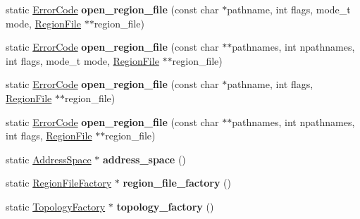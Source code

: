\begin{DoxyCompactItemize}
\item 
static \hyperlink{group__ERRORCODES_ga6263a3c9a0b8d36aea21cdd835ac99fe}{Error\+Code} {\bfseries open\+\_\+region\+\_\+file} (const char $\ast$pathname, int flags, mode\+\_\+t mode, \hyperlink{classalps_1_1RegionFile}{Region\+File} $\ast$$\ast$region\+\_\+file)\hypertarget{classalps_1_1Pegasus_aa7330693d15beebbf829e296a984a5a7}{}\label{classalps_1_1Pegasus_aa7330693d15beebbf829e296a984a5a7}

\item 
static \hyperlink{group__ERRORCODES_ga6263a3c9a0b8d36aea21cdd835ac99fe}{Error\+Code} {\bfseries open\+\_\+region\+\_\+file} (const char $\ast$$\ast$pathnames, int npathnames, int flags, mode\+\_\+t mode, \hyperlink{classalps_1_1RegionFile}{Region\+File} $\ast$$\ast$region\+\_\+file)\hypertarget{classalps_1_1Pegasus_a1674c4a5dbb6b199f629294b7693b8db}{}\label{classalps_1_1Pegasus_a1674c4a5dbb6b199f629294b7693b8db}

\item 
static \hyperlink{group__ERRORCODES_ga6263a3c9a0b8d36aea21cdd835ac99fe}{Error\+Code} {\bfseries open\+\_\+region\+\_\+file} (const char $\ast$pathname, int flags, \hyperlink{classalps_1_1RegionFile}{Region\+File} $\ast$$\ast$region\+\_\+file)\hypertarget{classalps_1_1Pegasus_aa9131da83f3334082f097d6cf4126646}{}\label{classalps_1_1Pegasus_aa9131da83f3334082f097d6cf4126646}

\item 
static \hyperlink{group__ERRORCODES_ga6263a3c9a0b8d36aea21cdd835ac99fe}{Error\+Code} {\bfseries open\+\_\+region\+\_\+file} (const char $\ast$$\ast$pathnames, int npathnames, int flags, \hyperlink{classalps_1_1RegionFile}{Region\+File} $\ast$$\ast$region\+\_\+file)\hypertarget{classalps_1_1Pegasus_af7e9d5041fe8dd956fb1c16df120ec4e}{}\label{classalps_1_1Pegasus_af7e9d5041fe8dd956fb1c16df120ec4e}

\item 
static \hyperlink{classalps_1_1AddressSpace}{Address\+Space} $\ast$ {\bfseries address\+\_\+space} ()\hypertarget{classalps_1_1Pegasus_a0994d567bc6c509972d3f92223482445}{}\label{classalps_1_1Pegasus_a0994d567bc6c509972d3f92223482445}

\item 
static \hyperlink{classalps_1_1RegionFileFactory}{Region\+File\+Factory} $\ast$ {\bfseries region\+\_\+file\+\_\+factory} ()\hypertarget{classalps_1_1Pegasus_a5d35cbc08b21204f62dd47d901a81d44}{}\label{classalps_1_1Pegasus_a5d35cbc08b21204f62dd47d901a81d44}

\item 
static \hyperlink{classalps_1_1TopologyFactory}{Topology\+Factory} $\ast$ {\bfseries topology\+\_\+factory} ()\hypertarget{classalps_1_1Pegasus_a6959ebba3ef27f5baad94a2aaa25bd52}{}\label{classalps_1_1Pegasus_a6959ebba3ef27f5baad94a2aaa25bd52}

\end{DoxyCompactItemize}
